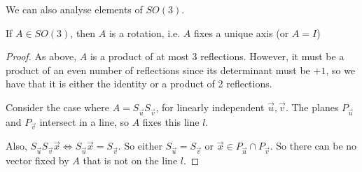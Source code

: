 \documentclass[../Main.tex]{subfiles}
\begin{document}
We can also analyse elements of $SO(3)$.
\begin{lemma}[Elements of $SO(3)$]
    If $A \in SO(3)$, then $A$ is a rotation, i.e. $A$ fixes a unique axis (or $A = I$)
\end{lemma}
\begin{proof}
    As above, $A$ is a product of at most $3$ reflections. However, it must be a product of an even number of reflections since its determinant must be $+1$, so we have that it is either the identity or a product of 2 reflections.\par
    Consider the case where $A = S_{\vec{u}} S_{\vec{v}}$, for linearly independent $\vec{u}, \vec{v}$. The planes $P_{\vec{u}}$ and $P_{\vec{v}}$ intersect in a line, so $A$ fixes this line $l$.\par
    Also, $S_{\vec{u}} S_{\vec{v}} \vec{x} \Leftrightarrow S_{\vec{u}} \vec{x} = S_{\vec{v}}$. So either $S_{\vec{u}} = S_{\vec{v}}$ or $\vec{x} \in P_{\vec{u}} \cap P_{\vec{v}}$. So there can be no vector fixed by $A$ that is not on the line $l$.
\end{proof}
\end{document}
